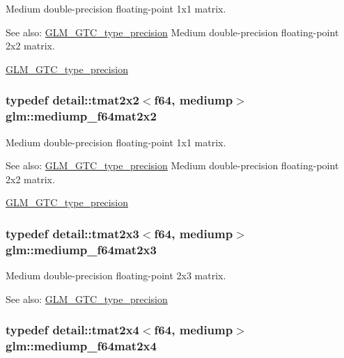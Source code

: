 Medium double-precision floating-point 1x1 matrix. \begin{Desc}
\item[See also:]\hyperlink{group__gtc__type__precision}{GLM\_\-GTC\_\-type\_\-precision} Medium double-precision floating-point 2x2 matrix. 

\hyperlink{group__gtc__type__precision}{GLM\_\-GTC\_\-type\_\-precision} \end{Desc}
\hypertarget{group__gtc__type__precision_gcfa9f872c78d9e8b8e6c5dd0088db8fc}{
\subsubsection[mediump\_\-f64mat2x2]{\setlength{\rightskip}{0pt plus 5cm}typedef detail::tmat2x2$<$f64, mediump$>$ {\bf glm::mediump\_\-f64mat2x2}}}
\label{group__gtc__type__precision_gcfa9f872c78d9e8b8e6c5dd0088db8fc}


Medium double-precision floating-point 1x1 matrix. \begin{Desc}
\item[See also:]\hyperlink{group__gtc__type__precision}{GLM\_\-GTC\_\-type\_\-precision} Medium double-precision floating-point 2x2 matrix. 

\hyperlink{group__gtc__type__precision}{GLM\_\-GTC\_\-type\_\-precision} \end{Desc}
\hypertarget{group__gtc__type__precision_g6f463cb5e9b4e5c07a385843ed50e6b8}{
\subsubsection[mediump\_\-f64mat2x3]{\setlength{\rightskip}{0pt plus 5cm}typedef detail::tmat2x3$<$f64, mediump$>$ {\bf glm::mediump\_\-f64mat2x3}}}
\label{group__gtc__type__precision_g6f463cb5e9b4e5c07a385843ed50e6b8}


Medium double-precision floating-point 2x3 matrix. \begin{Desc}
\item[See also:]\hyperlink{group__gtc__type__precision}{GLM\_\-GTC\_\-type\_\-precision} \end{Desc}
\hypertarget{group__gtc__type__precision_g65c67789f7e2ff605d8f48dc3750a515}{
\subsubsection[mediump\_\-f64mat2x4]{\setlength{\rightskip}{0pt plus 5cm}typedef detail::tmat2x4$<$f64, mediump$>$ {\bf glm::mediump\_\-f64mat2x4}}}
\label{group__gtc__type__precision_g65c67789f7e2ff605d8f48dc3750a515}


